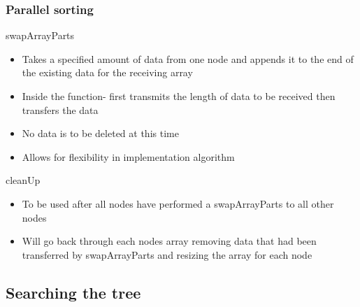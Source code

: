\documentclass[usernames,dvipsnames]{beamer}
\begin{document}
\begin{frame}    
    \frametitle{Parallel sorting}
    
    \begin{block}{swapArrayParts}
        \begin{itemize}
            \item Takes a specified amount of data from one node and appends it to the end of the existing data for the receiving array
            \item Inside the function- first transmits the length of data to be received then transfers the data
            \item No data is to be deleted at this time
            \item Allows for flexibility in implementation algorithm
        \end{itemize}
    \end{block}
    
    \begin{block}{cleanUp}
        \begin{itemize}
            \item To be used after all nodes have performed a swapArrayParts to all other nodes
            \item Will go back through each nodes array removing data that had been transferred by swapArrayParts and resizing the array for each node
        \end{itemize}
    \end{block}

\end{frame}

\subsection{Searching the tree}

\end{document}
